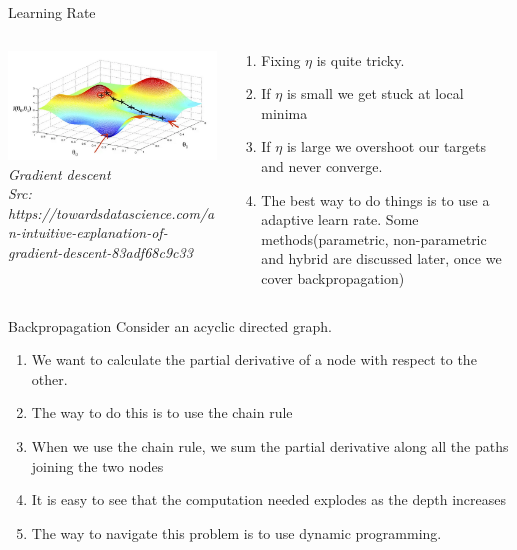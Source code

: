 \begin{frame}{Learning Rate}
  \begin{columns}[T]
  \begin{column}{0.4\textwidth}
    \includegraphics[width=\textwidth]{images/grad-desc.png}
    \tiny{\textit{Gradient descent\\ Src: https://towardsdatascience.com/an-intuitive-explanation-of-gradient-descent-83adf68c9c33}}
  \end{column}
  \begin{column}{0.6\textwidth}
  \begin{enumerate}[$\bullet$]
  \item Fixing $\eta$ is quite tricky.\pause
  \item If $\eta$ is small we get stuck at local minima\pause
  \item If $\eta$ is large we overshoot our targets and never converge.
  \item The best way to do things is to use a adaptive learn rate. Some methods(parametric, non-parametric and hybrid are discussed later, once we cover backpropagation)
  \end{enumerate}
  \end{column}
\end{columns}
\end{frame}


\begin{frame}{Backpropagation}
  Consider an acyclic directed graph. 
  \begin{enumerate}[$\bullet$]
  \item We want to calculate the partial derivative of a node with respect to the other.\pause
  \item The way to do this is to use the chain rule\pause
  \item When we use the chain rule, we sum the partial derivative along all the paths joining the two nodes
  \item It is easy to see that the computation needed explodes as the depth increases
  \item The way to navigate this problem is to use dynamic programming.
  \end{enumerate}
\end{frame}

